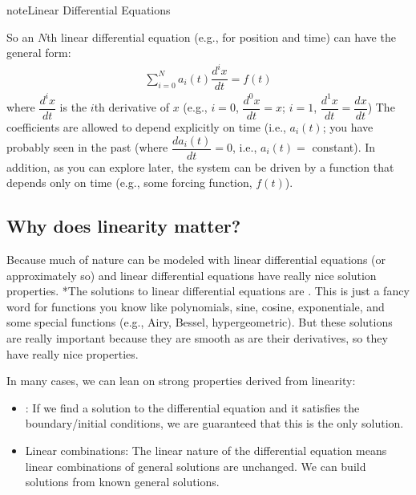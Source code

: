 \documentclass[letterpaper,10pt,english]{jupyterBook}
\begin{document}
\begin{sphinxadmonition}{note}{Linear Differential Equations}

\sphinxAtStartPar
So an \(N\)th linear differential equation (e.g., for position and time) can have the general form:
\begin{equation*}
\begin{split}\sum_{i=0}^N a_i(t)\dfrac{d^ix}{dt} = f(t)\end{split}
\end{equation*}
\sphinxAtStartPar
where \(\dfrac{d^ix}{dt}\) is the \(i\)th derivative of \(x\) (e.g., \(i=0\), \(\dfrac{d^0x}{dt}=x\); \(i=1\), \(\dfrac{d^1x}{dt}=\dfrac{dx}{dt}\)) The coefficients are allowed to depend explicitly on time (i.e., \(a_i(t)\); you have probably seen  in the past (where \(\dfrac{da_i(t)}{dt}=0\), i.e., \(a_i(t) =\) constant). In addition, as you can explore later, the system can be driven by a function that depends only on time (e.g., some forcing function, \(f(t)\)).
\end{sphinxadmonition}


\subsection{Why does linearity matter?}
\label{\detokenize{content/1_mechanics/sho/notes-SHO:why-does-linearity-matter}}
\sphinxAtStartPar
Because much of nature can be modeled with linear differential equations (or approximately so) and linear differential equations have really nice solution properties. *The solutions to linear differential equations are . This is just a fancy word for functions you know like polynomials, sine, cosine, exponentiale, and some special functions (e.g., Airy, Bessel, hypergeometric). But these solutions are really important because they are smooth as are their derivatives, so they have really nice properties.

\sphinxAtStartPar
In many cases, we can lean on strong properties derived from linearity:
\begin{itemize}
\item {} 
\sphinxAtStartPar
{}: If we find a solution to the differential equation and it satisfies the boundary/initial conditions, we are guaranteed that this is the only solution.

\item {} 
\sphinxAtStartPar
Linear combinations: The linear nature of the differential equation means linear combinations of general solutions are unchanged. We can build solutions from known general solutions.

\end{itemize}
\end{document}

